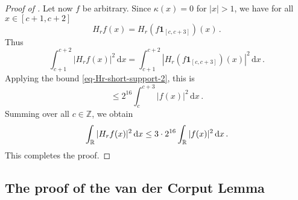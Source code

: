\begin{proof}[Proof of ]
    Let now $f$ be arbitrary.
    Since $\kappa(x) = 0$ for $|x| > 1$, we have for all $x \in [c+1, c+2]$
    $$
        H_rf(x) = H_r(f \mathbf{1}_{[c, c+3]})(x)\,.
    $$
    Thus
    $$
        \int_{c+1}^{c+2} |H_r f(x)|^2 \, \mathrm{d}x = \int_{c+1}^{c+2}|H_r(f \mathbf{1}_{[c, c+3]})(x)|^2 \, \mathrm{d}x\,.
    $$
    Applying the bound \eqref{eq-Hr-short-support-2}, this is
    $$
        \le 2^{16} \int_{c}^{c+3} |f(x)|^2 \, \mathrm{d}x\,.
    $$
    Summing over all $c \in \mathbb{Z}$, we obtain
    $$
        \int_{{\mathbb{R}}} |H_rf(x)|^2 \, \mathrm{d}x \le 3 \cdot 2^{16} \int_{{\mathbb{R}}} |f(x)|^2 \, \mathrm{d}x\,.
    $$
    This completes the proof.
\end{proof}







\subsection{The proof of the van der Corput Lemma}
\label{10vandercorput}

